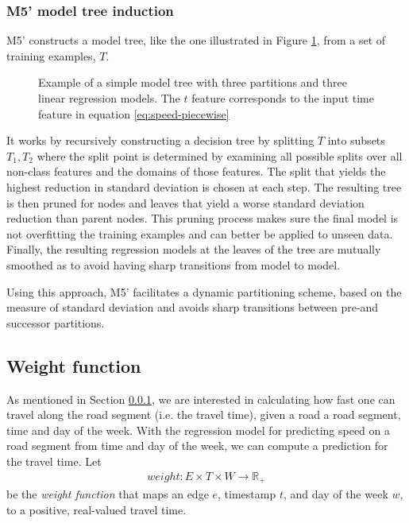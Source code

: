 \subsubsection{M5' model tree induction}
M5' constructs a model tree, like the one illustrated in Figure \ref{fig:model-tree}, from a set of training examples, $T$.
\begin{figure}[H]
	\centering
	\caption{Example of a simple model tree with three partitions and three linear regression models. The $t$ feature corresponds to the input time feature in equation \ref{eq:speed-piecewise}}
	\label{fig:model-tree}
\end{figure}
It works by recursively constructing a decision tree by splitting $T$ into subsets $T_1,T_2$ where the split point is determined by examining all possible splits over all non-class features and the domains of those features. The split that yields the highest reduction in standard deviation is chosen at each step.
The resulting tree is then pruned for nodes and leaves that yield a worse standard deviation reduction than parent nodes. This pruning process makes sure the final model is not overfitting the training examples and can better be applied to unseen data. 
Finally, the resulting regression models at the leaves of the tree are mutually smoothed as to avoid having sharp transitions from model to model.

Using this approach, M5' facilitates a dynamic partitioning scheme, based on the measure of standard deviation and avoids sharp transitions between pre-and successor partitions.

\subsection{Weight function}\label{sec:weight-function}
As mentioned in Section \ref{}, we are interested in calculating how fast one can travel along the road segment (i.e. the travel time), given a road a road segment, time and day of the week. With the regression model for predicting speed on a road segment from time and day of the week, we can compute a prediction for the travel time. Let 
\begin{align}
weight: E \times T \times W \rightarrow \mathbb{R_+}
\end{align}
be the \emph{weight function} that maps an edge $e$, timestamp $t$, and day of the week $w$, to a positive, real-valued travel time.

